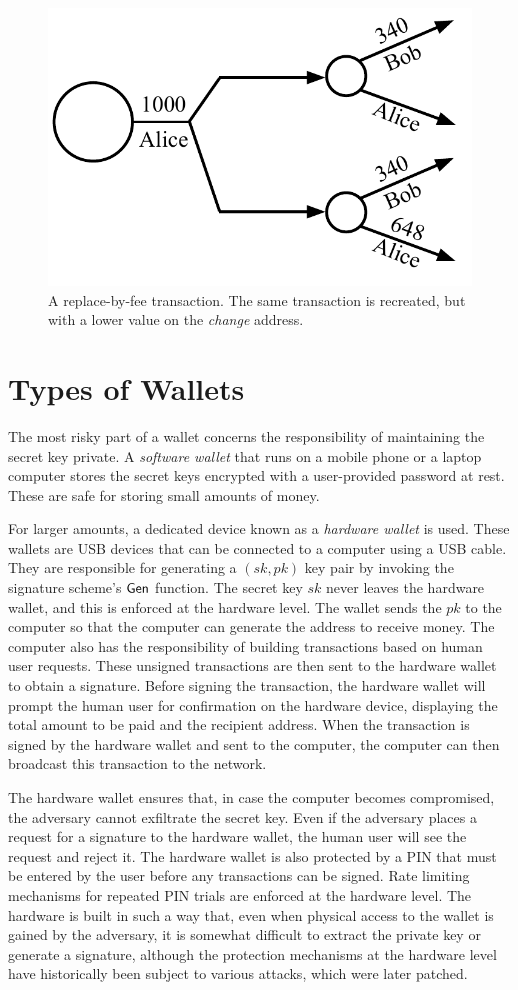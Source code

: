 \begin{figure}[h]
  \centering
  \includegraphics[width=0.4 \columnwidth,keepaspectratio]{figures/replace-by-fee.pdf}
  \caption{A replace-by-fee transaction. The same transaction is recreated, but with
           a lower value on the \emph{change} address.}
  \label{fig.replace-by-fee}
\end{figure}

\section{Types of Wallets}

The most risky part of a wallet concerns the responsibility of maintaining the
secret key private. A \emph{software wallet} that runs on a mobile phone or a
laptop computer stores the secret keys encrypted with a user-provided password
at rest. These are safe for storing small amounts of money.

For larger amounts,
a dedicated device known as a \emph{hardware wallet}
is used. These wallets are USB devices that can be connected to a computer
using a USB cable. They are responsible for generating a $(sk, pk)$ key pair
by invoking the signature scheme's $\mathsf{Gen}$ function. The secret key $sk$ never
leaves the hardware wallet, and this is enforced at the hardware level. The
wallet sends the $pk$ to the computer so that the computer can generate the
address to receive money. The computer also has the responsibility
of building transactions based on human user requests. These unsigned
transactions are then sent to the hardware wallet to obtain a signature.
Before signing the transaction, the hardware wallet will prompt the human
user for confirmation on the hardware device, displaying the total amount
to be paid and the recipient address. When the transaction is signed by
the hardware wallet and sent to the computer, the computer can then
broadcast this transaction to the network.

The hardware wallet ensures that, in case the computer becomes compromised,
the adversary cannot exfiltrate the secret key. Even if the adversary
places a request for a signature to the hardware wallet, the human user
will see the request and reject it. The hardware wallet is also protected
by a PIN that must be entered by the user before any transactions can be
signed. Rate limiting mechanisms for repeated PIN trials are enforced at
the hardware level. The hardware is built in such a way that, even when physical
access to the wallet is gained by the adversary, it is somewhat difficult
to extract the private key or generate a signature, although the protection
mechanisms at the hardware level have historically been subject to various
attacks, which were later patched.

